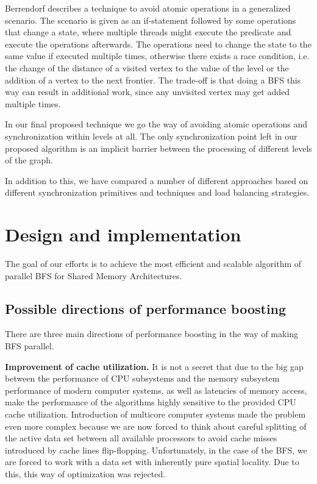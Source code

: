 \documentclass[letterpaper]{article}
\begin{document}
		Berrendorf\cite{Berrendorf:14} describes a technique to avoid atomic operations in a generalized scenario. 
		The scenario is given as an if-statement followed by some operations that change a state, where multiple threads might execute the predicate and execute the operations afterwards. 
		The operations need to change the state to the same value if executed multiple times, otherwise there exists a race condition, i.e. the change of the distance of a visited vertex to the value of the level or the addition of a vertex to the next frontier. 
		The trade-off is that doing a BFS this way can result in additional work, since any unvisited vertex may get added multiple times.
		
		In our final proposed technique we go the way of avoiding atomic operations and synchronization within levels at all.
		The only synchronization point left in our proposed algorithm is an implicit barrier between the processing of different levels of the graph.
		
		In addition to this, we have compared a number of different approaches based on different synchronization primitives and techniques and load balancing strategies.

	
	
	\section{Design and implementation}\label{sec:deim} %
		The goal of our efforts is to achieve the most efficient and scalable algorithm of parallel BFS for Shared Memory Architectures. 

		\subsection{Possible directions of performance boosting}
			There are three main directions of performance boosting in the way of making BFS parallel.
			
			\textbf{Improvement of cache utilization.}
			It is not a secret that due to the big gap between the performance of CPU subsystems and the memory subsystem performance of modern computer systems, as well as latencies of memory access, make the performance of the algorithms highly sensitive to the provided CPU cache utilization. 
			Introduction of multicore computer systems made the problem even more complex because  we are now forced to think about careful splitting of the active data set between all available processors to avoid cache misses introduced by cache lines flip-flopping. 
			Unfortunately, in the case of the BFS, we are forced to work with a data set with inherently pure spatial locality. 
			Due to this, this way of optimization was rejected.
			
\end{document}
